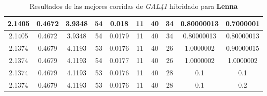 \begin{table}[h!]
\begin{center}
\begin{tabular}{|c|c|c|c|c|c|c|c|c|c|}
        \hline
            2.1405 & 0.4672  & 3.9348 & 54 & 0.018 & 11 & 40 & 34 & 0.80000013 & 0.7000001\\
        \hline
        \hline
            2.1405 & 0.4672  & 3.9348 & 54 & 0.0179 & 11 & 40 & 34 & 0.80000013 & 0.80000013\\
        \hline
        \hline
            2.1374 & 0.4679  & 4.1193 & 53 & 0.0176 & 11 & 40 & 26 & 1.0000002 & 0.90000015\\
        \hline
        \hline
            2.1374 & 0.4679  & 4.1193 & 54 & 0.0177 & 11 & 40 & 26 & 1.0000002 & 1.0000002\\
        \hline
        \hline
            2.1374 & 0.4679  & 4.1193 & 53 & 0.0176 & 11 & 40 & 28 & 0.1 & 0.1\\
        \hline
        \hline
            2.1374 & 0.4679  & 4.1193 & 53 & 0.0176 & 11 & 40 & 28 & 0.1 & 0.2\\
        \hline
        \end{tabular}
        \caption{Resultados de las mejores corridas de \emph{GAL41} hibridado para {\bf Lenna}}
        \label{tb:tableGAL41}
    \end{center}
\end{table}
